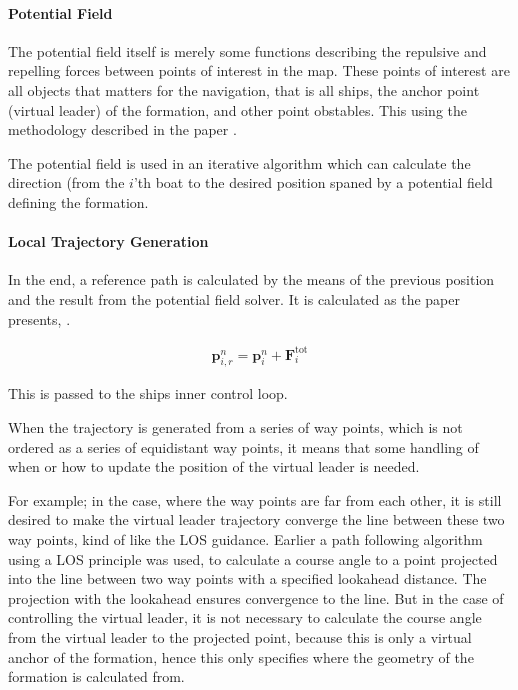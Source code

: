 \paragraph{Potential Field}
The potential field itself is merely some functions describing the
repulsive and repelling forces between points of interest in the map.
These points of interest are all objects that matters for the
navigation, that is all ships, the anchor point (virtual leader) of
the formation, and other point obstables. This using the methodology
described in the paper \citep{UAVff3dpf}.

The potential field is used in an iterative algorithm which can
calculate the direction (from the $i$'th boat to the desired position
spaned by a potential field defining the formation.

\paragraph{Local Trajectory Generation}
In the end, a reference path is calculated by the means of the
previous position and the result from the potential field
solver. It is calculated as the paper presents, \citep[eq.
48]{UAVff3dpf}.

\begin{align}
	\mathbf{p}_{i,r}^n = \mathbf{p}_i^n + \mathbf{F}_i ^\text{tot}
\end{align}

This is passed to the ships inner control loop.

When the trajectory is generated from a series of way points, which is
not ordered as a series of equidistant way points, it means that some
handling of when or how to update the position of the virtual leader
is needed.

For example; in the case, where the way points are far from each
other, it is still desired to make the virtual leader trajectory
converge the line between these two way points, kind of like the
\ac{LOS} guidance. Earlier a path following algorithm using a \ac{LOS}
principle was used, to calculate a course angle to a point projected
into the line between two way points with a specified lookahead
distance. The projection with the lookahead ensures convergence to the
line. But in the case of controlling the virtual leader, it is not
necessary to calculate the course angle from the virtual leader to the
projected point, because this is only a virtual anchor of the
formation, hence this only specifies where the geometry of the
formation is calculated from. 

